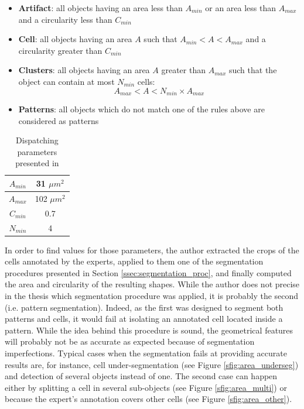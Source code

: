 \begin{itemize}
	\item \textbf{Artifact}: all objects having an area less than $A_{min}$ or an area less than $A_{max}$ and a circularity less than $C_{min}$
	\item \textbf{Cell}: all objects having an area $A$ such that $A_{min} < A < A_{max}$ and a circularity greater than $C_{min}$
	\item \textbf{Clusters}: all objects having an area $A$ greater than $A_{max}$ such that the object can contain at most $N_{min}$ cells:
	\[
		A_{max} < A < N_{min} \times A_{max}
	\]
	\item \textbf{Patterns}: all objects which do not match one of the rules above are considered as patterns
\end{itemize}

\begin{table}
	\center
	\begin{tabular}{|c|c|}
		\hline
		$A_{min}$ & 31 $\mu m^2$\\
		\hline
		$A_{max}$ & 102 $\mu m^2$\\
		\hline
		$C_{min}$ & 0.7 \\
		\hline
		$N_{min}$ & 4\\
		\hline
	\end{tabular}
	\caption{Dispatching parameters presented in \cite{adeblire2013}}
	\label{tab:adeb_disp_rules}
\end{table}

In order to find values for those parameters, the author extracted the crops of the cells annotated by the experts, applied to them one of the segmentation procedures presented in Section \ref{ssec:segmentation_proc}, and finally computed the area and circularity of the resulting shapes. While the author does not precise in the thesis which segmentation procedure was applied, it is probably the second (i.e. pattern segmentation). Indeed, as the first was designed to segment both patterns and cells, it would fail at isolating an annotated cell located inside a pattern. While the idea behind this procedure is sound, the geometrical features will probably not be as accurate as expected because of segmentation imperfections. Typical cases when the segmentation fails at providing accurate results are, for instance, cell under-segmentation (see Figure \ref{sfig:area_underseg}) and detection of several objects instead of one. The second case can happen either by splitting a cell in several sub-objects (see Figure \ref{sfig:area_multi}) or because the expert's annotation covers other cells (see Figure \ref{sfig:area_other}). 

